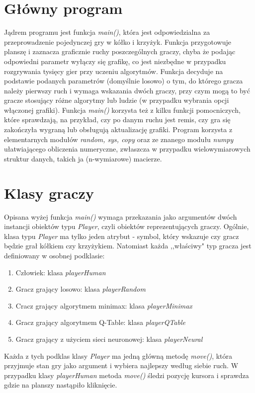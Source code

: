 \documentclass[licencjacka]{pracamgr}
\begin{document}
\section{Główny program}
Jądrem programu jest funkcja \textit{main()}, która jest odpowiedzialna za przeprowadzenie pojedynczej gry w kółko i krzyżyk. Funkcja przygotowuje planszę i zaznacza graficznie ruchy poszczególnych graczy, chyba że podając odpowiedni parametr wyłączy się grafikę, co jest niezbędne w przypadku rozgrywania tysięcy gier przy uczeniu algorytmów. Funkcja decyduje na podstawie podanych parametrów (domyślnie losowo) o tym, do którego gracza należy pierwszy ruch i wymaga wskazania dwóch graczy, przy czym mogą to być gracze stosujący różne algorytmy lub ludzie (w przypadku wybrania opcji włączonej grafiki). Funkcja \textit{main()} korzysta też z kilku funkcji pomocniczych, które sprawdzają, na przykład, czy po danym ruchu jest remis, czy gra się zakończyła wygraną  lub obsługują aktualizację grafiki. Program korzysta z elementarnych modułów \textit{random, sys, copy} oraz ze znanego modułu \textit{numpy} ułatwiającego obliczenia numeryczne, zwłaszcza w przypadku wielowymiarowych struktur danych, takich ja (n-wymiarowe) macierze.  

\section{Klasy graczy}
Opisana wyżej funkcja \textit{main()} wymaga przekazania jako argumentów dwóch instancji obiektów typu \textit{Player}, czyli obiektów reprezentujących graczy. Ogólnie, klasa typu \textit{Player} ma tylko jeden atrybut - symbol, który wskazuje czy gracz będzie grał kółkiem czy krzyżykiem. Natomiast każda ,,właściwy" typ gracza jest definiowany w osobnej podklasie:
\begin{enumerate}
	\item{Człowiek: klasa \textit{playerHuman}}
	\item{Gracz grający losowo: klasa \textit{playerRandom}}	
	\item{Cracz grający algorytmem minimax: klasa \textit{playerMinimax}}
	\item{Gracz grający algorytmem Q-Table: klasa \textit{playerQTable}}
	\item{Gracz grający z użyciem sieci neuronowej: klasa \textit{playerNeural}}
\end{enumerate}
Każda z tych podklas klasy \textit{Player} ma jedną główną metodę \textit{move()}, która przyjmuje stan  gry jako argument i wybiera najlepszy według siebie ruch. W przypadku klasy \textit{playerHuman} metoda \textit{move()} śledzi pozycję kursora i sprawdza gdzie na  planszy nastąpiło kliknięcie.  \\
\end{document}
